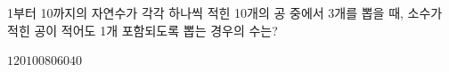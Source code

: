 1부터 10까지의 자연수가 각각 하나씩 적힌 10개의 공 중에서 3개를 뽑을 때, 소수가 적힌 공이 적어도 1개 포함되도록 뽑는 경우의 수는?
\begin{choices32}{$120$}{$100$}{$80$}{$60$}{$40$}\end{choices32}
